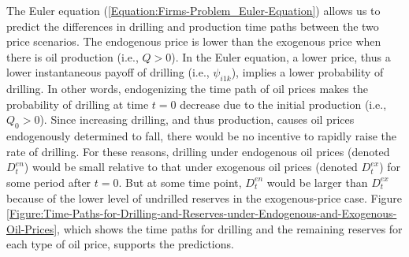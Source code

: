 The Euler equation (\ref{Equation:Firms-Problem_Euler-Equation}) allows us to predict the differences in drilling and production time paths between the two price scenarios. The endogenous price is lower than the exogenous price when there is oil production (i.e., $Q > 0$). In the Euler equation, a lower price, thus a lower instantaneous payoff of drilling (i.e., $\psi_{i1k}$),  implies a lower probability of drilling. In other words, endogenizing the time path of oil prices makes the probability of drilling at time $t = 0$ decrease due to the initial production (i.e., $Q_{0} > 0$). Since increasing drilling, and thus production, causes oil prices endogenously determined to fall, there would be no incentive to rapidly raise the rate of drilling. For these reasons, drilling under endogenous oil prices (denoted $D_{t}^{en}$) would be small relative to that under exogenous oil prices (denoted $D_{t}^{ex}$) for some period after $t = 0$. But at some time point, $D_{t}^{en}$ would be larger than $D_{t}^{ex}$ because of the lower level of undrilled reserves in the exogenous-price case. Figure \ref{Figure:Time-Paths-for-Drilling-and-Reserves-under-Endogenous-and-Exogenous-Oil-Prices}, which shows the time paths for drilling and the remaining reserves for each type of oil price, supports the predictions.

